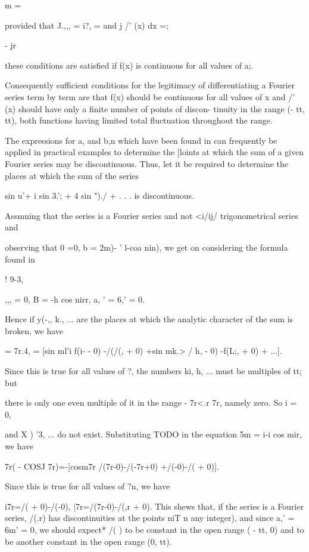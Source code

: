   m = \

provided that J.,,, = i?, = and j /' (x) dx =;

- jr

these conditions are satisfied if f(x) is continuous for all values of
a;.

Consequently sufficient conditions for the legitimacy of
differentiating a Fourier series term by term are that f(x) should be
continuous for all values of x and /' (x) should have only a finite
number of points of discon- tinuity in the range (- tt, tt), both
functions having limited total fluctuation throughout the range.


The expressions for a, and b,n which have been found in can
frequently be applied in practical examples to determine the [loints
at which the sum of a given Fourier series may be discontinuous. Thus,
let it be required to determine the places at which the sum of the
series

sin u'+ i sin 3.'; + 4 sin ")./ + . . . is discontinuous.

  Assmning that the series is a Fourier series and not <i/ij/
trigonometrical series and

observing that 0 =0, b = 2m)- ' l-coa nin), we get on considering the
formula found in

! 9-3,

,,, = 0, B = -h cos nirr, a, ' = 6,' = 0.

Hence if y(-,, k., ... are the places at which the analytic
character of the sum is broken, we have

= 7r.4, = [sin ml'i f(i- - 0) -/(/(, + 0) +sin mk.> / h, - 0) -f(L;,
+ 0) + ...].

Since this is true for all values of ?, the numbers ki, h, ... must
be multiples of tt; but

there is only one even multiple of it in the range - 7r<.r 7r, namely
zero. So i = 0,

and X ) '3, ... do not exist. Substituting TODO in the equation 5m =
i-i cos mir, we have

7r( - COSJ 7r)=-[cosm7r /(7r-0)-/(-7r+0) +/(-0)-/( + 0)].

Since this is true for all values of ?n, we have

i7r=/( + 0)-/(-0), |7r=/(7r-0)-/(,r + 0). This shews that, if the
series is a Fourier series, /(.r) has discontinuities at the points
niT n any integer), and since a,' = 6m' = 0, we should expect* /( )
to be constant in the open range ( - tt, 0) and to be another constant
in the open range (0, tt).

